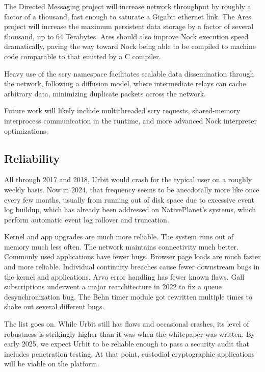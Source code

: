 \documentclass[twoside]{article}
\begin{document}
The Directed Messaging project will increase network throughput by roughly a factor of a thousand, fast enough to saturate a Gigabit ethernet link.  The Ares project will increase the maximum persistent data storage by a factor of several thousand, up to 64 Terabytes.  Ares should also improve Nock execution speed dramatically, paving the way toward Nock being able to be compiled to machine code comparable to that emitted by a C compiler.

Heavy use of the scry namespace facilitates scalable data dissemination through the network, following a diffusion model, where intermediate relays can cache arbitrary data, minimizing duplicate packets across the network.

Future work will likely include multithreaded scry requests, shared-memory interprocess communication in the runtime, and more advanced Nock interpreter optimizations.

\subsection{Reliability}

All through 2017 and 2018, Urbit would crash for the typical user on a roughly weekly basis.  Now in 2024, that frequency seems to be anecdotally more like once every few months, usually from running out of disk space due to excessive event log buildup, which has already been addressed on NativePlanet's systems, which perform automatic event log rollover and truncation.

Kernel and app upgrades are much more reliable.  The system runs out of memory much less often.  The network maintains connectivity much better.  Commonly used applications have fewer bugs.  Browser page loads are much faster and more reliable.  Individual continuity breaches cause fewer downstream bugs in the kernel and applications.  Arvo error handling has fewer known flaws.  Gall subscriptions underwent a major rearchitecture in 2022 to fix a queue desynchronization bug.  The Behn timer module got rewritten multiple times to shake out several different bugs.

The list goes on.  While Urbit still has flaws and occasional crashes, its level of robustness is strikingly higher than it was when the whitepaper was written.  By early 2025, we expect Urbit to be reliable enough to pass a security audit that includes penetration testing.  At that point, custodial cryptographic applications will be viable on the platform.
\end{document}
